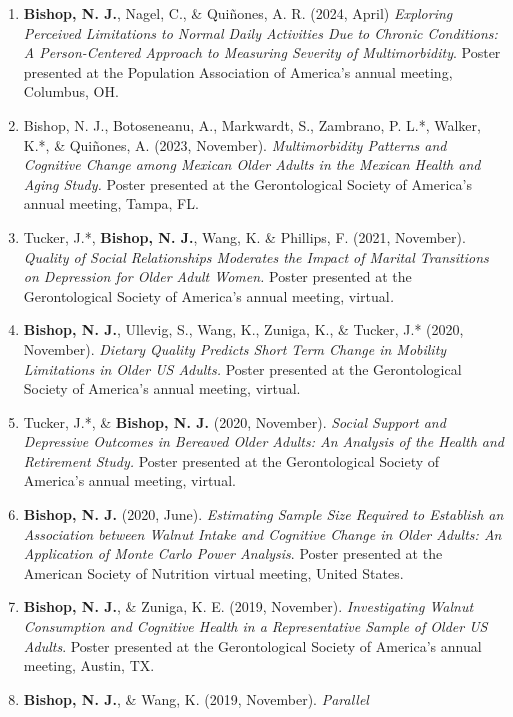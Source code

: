 \documentclass[
]{article}
\begin{document}
\begin{enumerate}
\def\labelenumi{\arabic{enumi}.}
\item
  \textbf{Bishop, N. J.}, Nagel, C., \& Quiñones, A. R. (2024, April)
  \emph{Exploring Perceived Limitations to Normal Daily Activities Due
  to Chronic Conditions: A Person-Centered Approach to Measuring
  Severity of Multimorbidity}. Poster presented at the Population
  Association of America's annual meeting, Columbus, OH.
\item
  Bishop, N. J., Botoseneanu, A., Markwardt, S., Zambrano, P. L.*,
  Walker, K.*, \& Quiñones, A. (2023, November). \emph{Multimorbidity
  Patterns and Cognitive Change among Mexican Older Adults in the
  Mexican Health and Aging Study.} Poster presented at the
  Gerontological Society of America's annual meeting, Tampa, FL.
\item
  Tucker, J.*, \textbf{Bishop, N. J.}, Wang, K. \& Phillips, F. (2021,
  November). \emph{Quality of Social Relationships Moderates the Impact
  of Marital Transitions on Depression for Older Adult Women.} Poster
  presented at the Gerontological Society of America's annual meeting,
  virtual\emph{.}
\item
  \textbf{Bishop, N. J.}, Ullevig, S., Wang, K., Zuniga, K., \& Tucker,
  J.* (2020, November). \emph{Dietary Quality Predicts Short Term Change
  in Mobility Limitations in Older US Adults.} Poster presented at the
  Gerontological Society of America's annual meeting, virtual.
\item
  Tucker, J.*, \& \textbf{Bishop, N. J.} (2020, November). \emph{Social
  Support and Depressive Outcomes in Bereaved Older Adults: An Analysis
  of the Health and Retirement Study.} Poster presented at the
  Gerontological Society of America's annual meeting, virtual.
\item
  \textbf{Bishop, N. J.} (2020, June). \emph{Estimating Sample Size
  Required to Establish an Association between Walnut Intake and
  Cognitive Change in Older Adults: An Application of Monte Carlo Power
  Analysis}. Poster presented at the American Society of Nutrition
  virtual meeting, United States.
\item
  \textbf{Bishop, N. J.}, \& Zuniga, K. E. (2019, November).
  \emph{Investigating Walnut Consumption and Cognitive Health in a
  Representative Sample of Older US Adults}. Poster presented at the
  Gerontological Society of America's annual meeting, Austin, TX.
\item
  \textbf{Bishop, N. J.}, \& Wang, K. (2019, November). \emph{Parallel
}
\end{enumerate}
\end{document}
